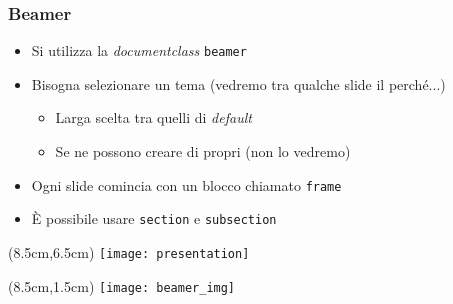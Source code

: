 \begin{frame}
  
  \frametitle{Beamer}
  
  \begin{itemize}
   \item Si utilizza la \textit{documentclass} \texttt{beamer}
   \item Bisogna selezionare un tema (vedremo tra qualche slide il perché...)
   \begin{itemize}
    \item Larga scelta tra quelli di \textit{default}
    \item Se ne possono creare di propri (non lo vedremo)
   \end{itemize}
   \item Ogni slide comincia con un blocco chiamato \texttt{frame}
   \item È possibile usare \texttt{section} e \texttt{subsection}
  \end{itemize}
  
  \begin{textblock*}{5cm}(8.5cm,6.5cm)
    \texttt{[image: presentation]}
  \end{textblock*}
 
  \begin{textblock*}{5cm}(8.5cm,1.5cm)
    \texttt{[image: beamer\_img]}
  \end{textblock*}

\end{frame}
